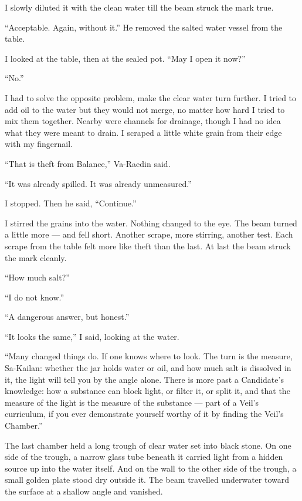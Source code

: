 I slowly diluted it with the clean water till the beam struck the mark true.\par

``Acceptable. Again, without it.'' He removed the salted water vessel from the table.

I looked at the table, then at the sealed pot. ``May I open it now?''\par
``No.''\par

I had to solve the opposite problem, make the clear water turn further. I tried to add oil to the water but they would not merge, no matter how hard I tried to mix them together. Nearby were channels for drainage, though I had no idea what they were meant to drain. I scraped a little white grain from their edge with my fingernail.\par

``That is theft from Balance,'' Va-Raedin said.\par
``It was already spilled. It was already unmeasured.''\par
I stopped. Then he said, ``Continue.''\par

I stirred the grains into the water. Nothing changed to the eye. The beam turned a little more --- and fell short. Another scrape, more stirring, another test. Each scrape from the table felt more like theft than the last. At last the beam struck the mark cleanly.\par

``How much salt?''\par
``I do not know.''\par
``A dangerous answer, but honest.''\par
``It looks the same,'' I said, looking at the water.\par
``Many changed things do. If one knows where to look. The turn is the measure, Sa-Kailan: whether the jar holds water or oil, and how much salt is dissolved in it, the light will tell you by the angle alone. There is more past a Candidate's knowledge: how a substance can block light, or filter it, or split it, and that the measure of the light is the measure of the substance --- part of a Veil's curriculum, if you ever demonstrate yourself worthy of it by finding the Veil's Chamber.''\par

\ornament

The last chamber held a long trough of clear water set into black stone. On one side of the trough, a narrow glass tube beneath it carried light from a hidden source up into the water itself. And on the wall to the other side of the trough, a small golden plate stood dry outside it. The beam travelled underwater toward the surface at a shallow angle and vanished.\par

